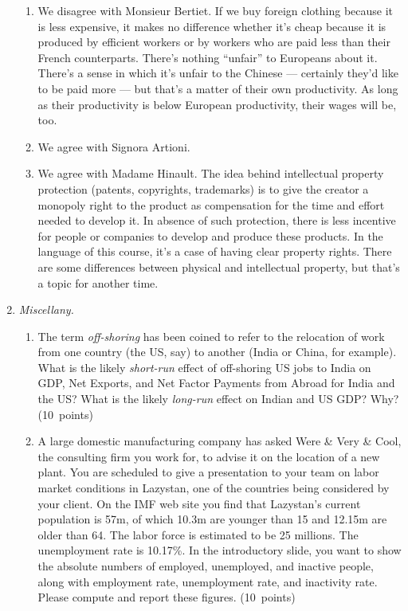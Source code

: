 \documentclass[letterpaper,12pt]{article}
\begin{document}
\begin{enumerate}
\begin{enumerate}
\item We disagree with Monsieur Bertiet. If we buy foreign
clothing because it is less expensive, it makes no difference
whether it's cheap because it is produced by efficient workers or
by workers who are paid less than their French counterparts.
There's nothing ``unfair'' to Europeans about it. There's a sense
in which it's unfair to the Chinese --- certainly they'd like to
be paid more --- but that's a matter of their own productivity.
As long as their productivity is below European productivity,
their wages will be, too.

\item We agree with Signora Artioni.

\item We agree with Madame Hinault.  The idea behind intellectual
property protection (patents, copyrights, trademarks) is to give
the creator a monopoly right to the product as compensation for
the time and effort needed to develop it. In absence of such
protection, there is less incentive for people or companies to
develop and produce these products.  In the language of this
course, it's a case of having clear property rights.  There are
some differences between physical and intellectual property, but
that's a topic for another time.

\end{enumerate}


\item {\it Miscellany.}
%
\begin{enumerate}

\item The term \textit{off-shoring} has been coined to refer to
the relocation of work from one country (the US, say) to another
(India or China, for example).  What is the likely
\textit{short-run} effect of off-shoring US jobs to India on GDP,
Net Exports, and Net Factor Payments from Abroad for India and the
US? What is the likely \textit{long-run} effect on Indian and US
GDP? Why? (10~points)

\item A large domestic manufacturing company has asked Were \&
Very \& Cool, the consulting firm you work for, to advise it on
the location of a new plant. You are scheduled to give a
presentation to your team on labor market conditions in Lazystan,
one of the countries being considered by your client. On the IMF
web site you find that Lazystan's current population is 57m, of
which 10.3m are younger than 15 and 12.15m are older than 64. The
labor force is estimated to be 25 millions. The unemployment rate
is 10.17\%. In the introductory slide, you want to show the
absolute numbers of employed, unemployed, and inactive people,
along with employment rate, unemployment rate, and inactivity
rate. Please compute and report these figures. (10~points)


\end{enumerate}
\end{enumerate}
\end{document}
